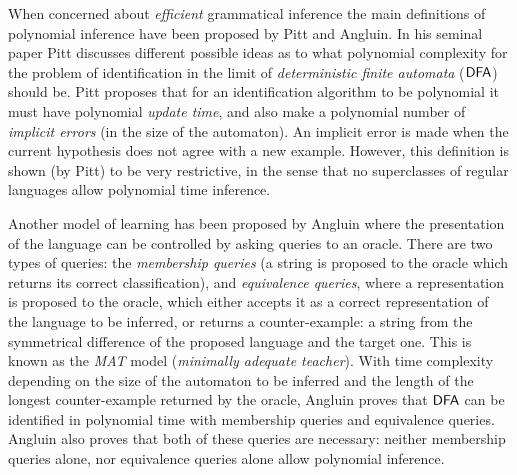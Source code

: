 When concerned about \emph{efficient} grammatical inference \cite{delaHiguera1997} the main definitions of polynomial inference have been proposed by Pitt and Angluin. In his seminal paper \cite{Pitt89} Pitt discusses different possible ideas as to what polynomial complexity for the problem of identification in the limit of \emph{deterministic finite automata} ($\textup{\sf DFA}$) should be. %
Pitt proposes that for an identification algorithm to be polynomial it must have polynomial \emph{update time}, and also make a polynomial number of \emph{implicit errors} (in the size of the automaton). An implicit error is made when the current hypothesis does not agree with a new example. However, this definition is shown (by Pitt) to be very restrictive, in the sense that no superclasses of regular languages allow polynomial time inference.

Another model of learning has been proposed by Angluin \cite{Angluin1988} where the presentation of the language can be controlled by asking queries to an oracle. There are two types of queries: the \emph{membership queries} (a string is proposed to the oracle which returns its correct classification), and \emph{equivalence queries}, where a representation is proposed to the oracle, which either accepts it as a correct representation of the language to be inferred, or returns a counter-example: a string from the symmetrical difference of the proposed language and the target one. This is known as the \emph{MAT} model (\emph{minimally adequate teacher}). With time complexity depending on the size of the automaton to be inferred and the length of the longest counter-example returned by the oracle, Angluin proves that $\textup{\sf DFA}$ can be identified in polynomial time with membership queries and equivalence queries. Angluin also proves that both of these queries are necessary: neither membership queries alone, nor equivalence queries alone allow polynomial inference. 

